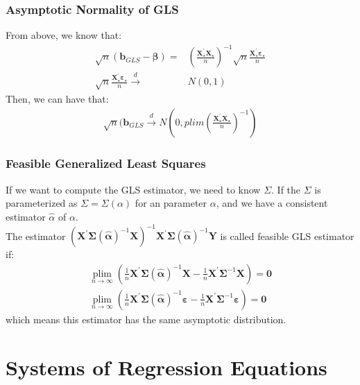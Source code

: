 \documentclass{article}
\begin{document}
\subsubsection{Asymptotic Normality of GLS}
From above, we know that:
	\begin{align*}
		\sqrt{n}(\boldsymbol{b}_{GLS} - \boldsymbol{\beta}) = &\left(\frac{\boldsymbol{X}_\star^\prime \boldsymbol{X}_\star}{n}\right)^{-1} \sqrt{n}\frac{\boldsymbol{X}_\star^\prime \boldsymbol{\varepsilon}_\star}{n}\\
		\sqrt{n}\frac{\boldsymbol{X}_\star^\prime \boldsymbol{\varepsilon}_\star}{n} \xrightarrow{d} &N(0, 1)
	\end{align*}
Then, we can have that:
	\begin{align*}
		\sqrt{n}(\boldsymbol{b}_{GLS} \xrightarrow{d} N(0, plim \left(\frac{\boldsymbol{X}_\star^\prime \boldsymbol{X}_\star}{n}\right)^{-1})
	\end{align*}

\subsubsection{Feasible Generalized Least Squares}
If we want to compute the GLS estimator, we need to know $\Sigma$. If the $\Sigma$ is parameterized as $\Sigma = \Sigma(\alpha)$ for an parameter $\alpha$, and we have a consistent estimator $\hat{\alpha}$ of $\alpha$.\\
The estimator $ (\boldsymbol{X}^\prime \boldsymbol{\Sigma}(\hat{\boldsymbol{\alpha}})^{-1} \boldsymbol{X})^{-1} \boldsymbol{X}^\prime \boldsymbol{\Sigma}(\hat{\boldsymbol{\alpha}})^{-1} \boldsymbol{Y}$ is called feasible GLS estimator if:
	\begin{align*}
		\mathop{plim}\limits_{n\to\infty} \left( \frac{1}{n} \boldsymbol{X}^\prime \boldsymbol{\Sigma}(\hat{\boldsymbol{\alpha}})^{-1} \boldsymbol{X} - \frac{1}{n} \boldsymbol{X}^\prime \boldsymbol{\Sigma}^{-1} \boldsymbol{X} \right) = \boldsymbol{0}\\
		\mathop{plim}\limits_{n\to\infty} \left( \frac{1}{n} \boldsymbol{X}^\prime \boldsymbol{\Sigma}(\hat{\boldsymbol{\alpha}})^{-1} \boldsymbol{\varepsilon} - \frac{1}{n} \boldsymbol{X}^\prime \boldsymbol{\Sigma}^{-1} \boldsymbol{\varepsilon} \right) = \boldsymbol{0} 
	\end{align*}
which means this estimator has the same asymptotic distribution.



\newpage
\section{Systems of Regression Equations}
\end{document}

